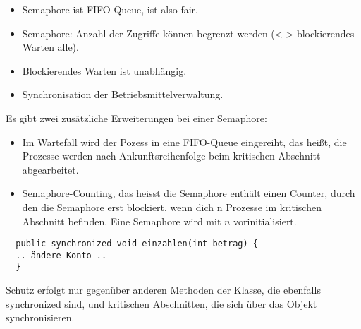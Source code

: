 \begin{answer}
\begin{itemize}

  \item Semaphore ist FIFO-Queue, ist also fair.

  \item Semaphore: Anzahl der Zugriffe können begrenzt werden (<-> blockierendes Warten alle).

  \item Blockierendes Warten ist unabhängig.

  \item Synchronisation der Betriebsmittelverwaltung.
\end{itemize}

Es gibt zwei zusätzliche Erweiterungen bei einer Semaphore:

\begin{itemize}

  \item Im Wartefall wird der Pozess in eine FIFO-Queue eingereiht, das heißt, die Prozesse werden nach Ankunftsreihenfolge beim kritischen Abschnitt abgearbeitet.

  \item Semaphore-Counting, das heisst die Semaphore enthält einen Counter, durch den die Semaphore erst blockiert, wenn dich n Prozesse im kritischen Abschnitt befinden. Eine Semaphore wird mit $n$ vorinitialisiert.

\end{itemize}
\end{answer}

\begin{answer}
\begin{verbatim}
  public synchronized void einzahlen(int betrag) {
  .. ändere Konto ..
  }
\end{verbatim}

Schutz erfolgt nur gegenüber anderen Methoden der Klasse, die ebenfalls synchronized sind, und kritischen Abschnitten, die sich über das Objekt synchronisieren.
\end{answer}

